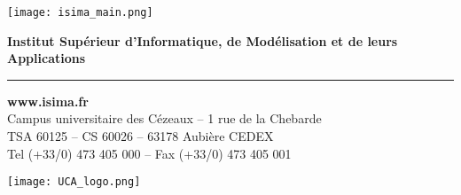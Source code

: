 \begin{titlepage}
  \vfill

  \begin{minipage}[c]{0.10\textwidth}
    \vfill
    \texttt{[image: isima\_main.png]}
    \vfill \null
  \end{minipage}
  \begin{minipage}[b]{0.89\textwidth}
    \textbf{Institut Supérieur d'Informatique, de Modélisation et de leurs Applications}
    \vskip1mm
    {\color{NavyBlue}\hrule}
    \vskip3mm
    \begin{minipage}{0.78\textwidth}
      \textcolor{NavyBlue}{\large\textbf{www.isima.fr}}\\
      Campus universitaire des Cézeaux -- 1 rue de la Chebarde\\
      TSA 60125 -- CS 60026 -- 63178 Aubière CEDEX\\
      Tel (+33/0) 473 405 000 -- Fax (+33/0) 473 405 001
    \end{minipage}
    \hfill
    \begin{minipage}{0.20\textwidth}
      \raggedleft
      \texttt{[image: UCA\_logo.png]}
    \end{minipage}
  \end{minipage} 

\end{titlepage}
\makeatother